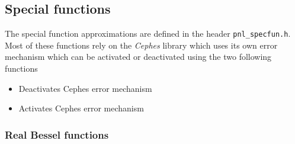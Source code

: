 \subsection{Special functions}

The special function approximations are defined in the header \verb!pnl_specfun.h!.\\

Most of these functions rely on the {\it Cephes} library which uses its own
error mechanism which can be activated or deactivated using the two following
functions
\begin{itemize}
  \item {}
    \sshortdescribe Deactivates Cephes error mechanism
  \item {}
    \sshortdescribe Activates Cephes error mechanism
\end{itemize}


\subsubsection{Real Bessel functions}

